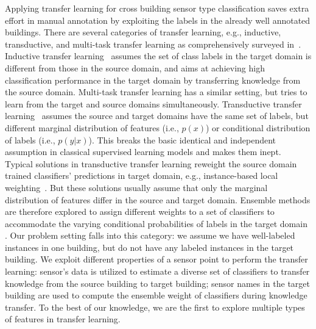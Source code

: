Applying transfer learning for cross building sensor type classification saves extra effort in manual annotation by exploiting the labels in the already well annotated buildings.
There are several categories of transfer learning, e.g., inductive, transductive, and multi-task transfer learning as comprehensively surveyed in~\cite{transfer1}.
Inductive transfer learning~\cite{transfer2} assumes the set of class labels in the target domain is different from those in the source domain, and aims at achieving high classification performance in the target domain by transferring knowledge from the source domain. Multi-task transfer learning \cite{multitask} has a similar setting, but tries to learn from the target and source domains simultaneously. Transductive transfer learning~\cite{transfer3} assumes the source and target domains have the same set of labels, but different marginal distribution of features (i.e., $p(x)$) or conditional distribution of labels (i.e., $p(y|x)$). This breaks the basic identical and independent assumption in classical supervised learning models and makes them inept. Typical solutions in transductive transfer learning reweight the source domain trained classifiers' predictions in target domain, e.g., instance-based local weighting~\cite{weight1,weight2,weight3}. But these solutions usually assume that only the marginal distribution of features differ in the source and target domain. Ensemble methods are therefore explored to assign different weights to a set of classifiers to accommodate the varying conditional probabilities of labels in the target domain \cite{ensem1,ensem2}. Our problem setting falls into this category: we assume we have well-labeled instances in one building, but do not have any labeled instances in the target building. We exploit different properties of a sensor point to perform the transfer learning: sensor's  data is utilized to estimate a diverse set of classifiers to transfer knowledge from the source building to target building; sensor names in the target building are used to compute the ensemble weight of classifiers during knowledge transfer.
To the best of our knowledge, we are the first to explore multiple types of features in transfer learning.


